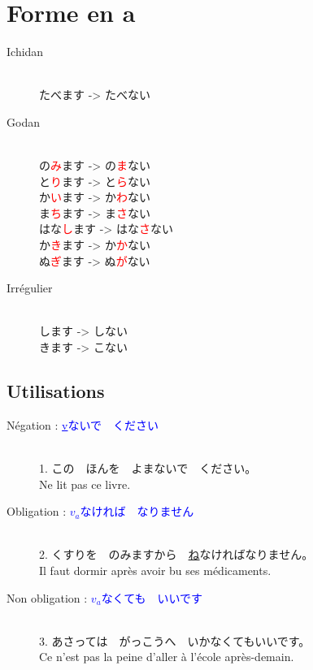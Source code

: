 \documentclass[11pt]{report}
\newenvironment{Japanese}{%
\CJKfamily{min}%
\CJKtilde  
\CJKnospace}{}
\begin{document}
\section{Forme en a}

\begin{CJK}{UTF8}{}  
\begin{Japanese}
	\begin{description}
		\item[Ichidan] \hfill \\
			たべます -> たべない
		\item[Godan] \hfill \\
			の\textcolor{red}{み}ます -> の\textcolor{red}{ま}ない \\
			と\textcolor{red}{り}ます -> と\textcolor{red}{ら}ない \\
			か\textcolor{red}{い}ます -> か\textcolor{red}{わ}ない \\
			ま\textcolor{red}{ち}ます -> ま\textcolor{red}{さ}ない \\
			はな\textcolor{red}{し}ます -> はな\textcolor{red}{さ}ない \\
			か\textcolor{red}{き}ます -> か\textcolor{red}{か}ない \\
			ぬ\textcolor{red}{ぎ}ます -> ぬ\textcolor{red}{が}ない
		\item[Irrégulier] \hfill \\
			します -> しない \\
			きます -> こない
	\end{description}
\end{Japanese}  
\end{CJK}

\subsection{Utilisations}

\begin{CJK}{UTF8}{}  
\begin{Japanese}
	\begin{description}
		\item[Négation : \textcolor{blue}{\underline{v}ないで　ください}] \hfill \\
		1. この　ほんを　よまないで　ください。 \\
		Ne lit pas ce livre.
		\item[Obligation : \textcolor{blue}{\underline{$v_{a}$}なければ　なりません}] \hfill \\
		2. くすりを　のみますから　\underline{ね}なければなりません。 \\
		Il faut dormir après avoir bu ses médicaments.
		\item[Non obligation : \textcolor{blue}{\underline{$v_{a}$}なくても　いいです}] \hfill \\
		3. あさっては　がっこうへ　いかなくてもいいです。 \\
		Ce n'est pas la peine d'aller \`a l'école après-demain.
	\end{description}
\end{Japanese}
\end{CJK}
\end{document}
